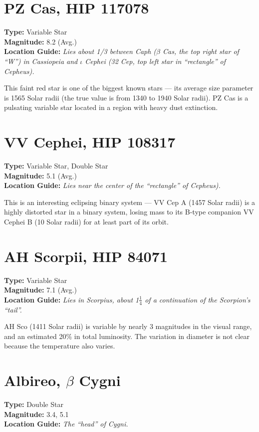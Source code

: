 \section{PZ Cas, HIP 117078}
\textbf{Type:} Variable Star \\
\textbf{Magnitude:} 8.2 (Avg.) \\
\textbf{Location Guide:} \textit{Lies about 1/3 between Caph ($\beta$
  Cas, the top right star of ``W'') in Cassiopeia and $\iota$ Cephei
  (32 Cep, top left star in ``rectangle'' of Cepheus).}

This faint red star is one of the biggest known stars --- its average
size parameter is 1565 Solar radii (the true value is from 1340 to
1940 Solar radii). PZ Cas is a pulsating variable star located in a
region with heavy dust extinction.


\section{VV Cephei, HIP 108317}
\textbf{Type:} Variable Star, Double Star \\
\textbf{Magnitude:} 5.1 (Avg.) \\
\textbf{Location Guide:} \textit{Lies near the center of the ``rectangle'' of Cepheus).}

This is an interesting eclipsing binary system --- VV Cep A (1457
Solar radii) is a highly distorted star in a binary system, losing
mass to its B-type companion VV Cephei B (10 Solar radii) for at least
part of its orbit.

\section{AH Scorpii, HIP 84071}
\textbf{Type:} Variable Star \\
\textbf{Magnitude:} 7.1 (Avg.) \\
\textbf{Location Guide:} \textit{Lies in Scorpius, about 1$\frac{1}{4}$ of a continuation of the Scorpion's ``tail''.}

AH Sco (1411 Solar radii) is variable by nearly 3 magnitudes in the
visual range, and an estimated 20\% in total luminosity. The variation
in diameter is not clear because the temperature also varies.

\section{Albireo, \texorpdfstring{$\beta$}{beta} Cygni}
\textbf{Type:} Double Star \\
\textbf{Magnitude:} 3.4, 5.1 \\
\textbf{Location Guide:} \textit{The ``head'' of Cygni.}

